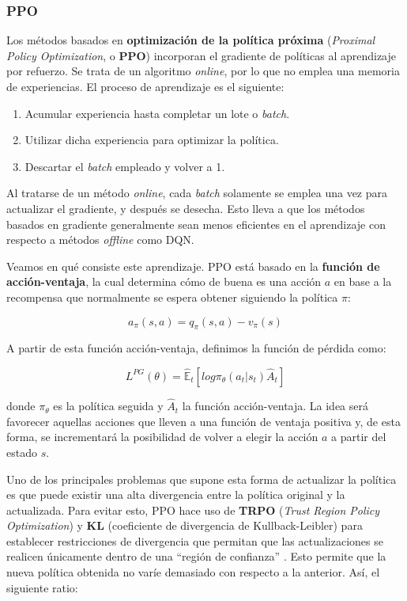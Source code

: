 \subsubsection{PPO}

Los métodos basados en \textbf{optimización de la política próxima} (\textit{Proximal Policy Optimization}, o \textbf{PPO}) \cite{schulman2017proximal, hsu2020revisiting} incorporan el gradiente de políticas al aprendizaje por refuerzo. Se trata de un algoritmo \textit{online}, por lo que no emplea una memoria de experiencias. El proceso de aprendizaje es el siguiente:

\begin{enumerate}
    \item Acumular experiencia hasta completar un lote o \textit{batch}.
    \item Utilizar dicha experiencia para optimizar la política.
    \item Descartar el \textit{batch} empleado y volver a 1.
\end{enumerate}

Al tratarse de un método \textit{online}, cada \textit{batch} solamente se emplea una vez para actualizar el gradiente, y después se desecha. Esto lleva a que los métodos basados en gradiente generalmente sean menos eficientes en el aprendizaje con respecto a métodos \textit{offline} como DQN.

Veamos en qué consiste este aprendizaje. PPO está basado en la \textbf{función de acción-ventaja}, la cual determina cómo de buena es una acción $a$ en base a la recompensa que normalmente se espera obtener siguiendo la política $\pi$:

\begin{equation}
\label{advantage}
    a_\pi(s,a) = q_\pi(s,a) - v_\pi(s)
\end{equation}

A partir de esta función acción-ventaja, definimos la función de pérdida como:

\begin{equation}
    L^{PG}(\theta) = \hat{\mathds{E}}_t[log\pi_\theta(a_t|s_t)\hat{A}_t]
\end{equation}

donde $\pi_\theta$ es la política seguida y $\hat{A}_t$ la función acción-ventaja. La idea será favorecer aquellas acciones que lleven a una función de ventaja positiva y, de esta forma, se incrementará la posibilidad de volver a elegir la acción $a$ a partir del estado $s$.

Uno de los principales problemas que supone esta forma de actualizar la política es que puede existir una alta divergencia entre la política original y la actualizada. Para evitar esto, PPO hace uso de \textbf{TRPO}  (\textit{Trust Region Policy Optimization}) y \textbf{KL} (coeficiente de divergencia de Kullback-Leibler) para establecer restricciones de divergencia que permitan que las actualizaciones se realicen únicamente dentro de una ``región de confianza'' \cite{schulman2015trust}. Esto permite que la nueva política obtenida no varíe demasiado con respecto a la anterior. Así, el siguiente ratio:

